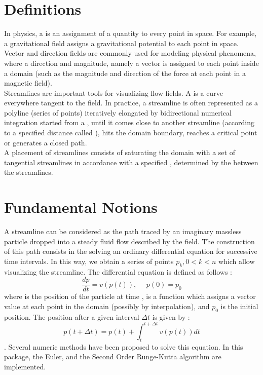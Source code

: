 \section{Definitions\label{Section_2D_Streamlines_Definitions}}

In physics, a  is an assignment of a quantity to every
point in space. For example, a gravitational field assigns a
gravitational potential to each point in space.\\

Vector and direction fields are commonly used for modeling physical
phenomena, where a direction and magnitude, namely a vector is assigned to
each point inside a domain (such as the magnitude and direction of the
force at each point in a magnetic field).\\

Streamlines are important tools for visualizing flow fields. A
 is a curve everywhere tangent to the field. In practice, 
a streamline is often represented as a polyline (series of points)
iteratively elongated by bidirectional numerical integration started
from a , until it comes close to another streamline
(according to a specified distance called ), hits the domain boundary, reaches a critical point or
generates a closed path.\\

A  placement of streamlines consists of saturating the
domain with a set of tangential streamlines in accordance with a
specified , determined by the 
between the streamlines.

\section{Fundamental Notions\label{Section_2D_Streamlines_Fundamental_notions}}

A streamline can be considered as the path traced by an imaginary
massless particle dropped into a steady fluid flow described by the
field. The construction of this path consists in the solving an
ordinary differential equation for successive time intervals. In this
way, we obtain a series of points $p_k, 0<k<n$ which allow visualizing
the streamline. The differential equation is defined as follows :
$$\frac{dp}{dt} = v(p(t)), \ \ \ \ \ \ p(0) = p_0$$ where  is the
position of the particle at time ,  is a function which
assigns a vector value at each point in the domain (possibly by
interpolation), and $p_0$ is the initial position.  The position after
a given interval $\Delta t$ is given by : $$p(t + \Delta t) = p(t) +
\int_t^{t+\Delta t} v(p(t)) dt$$. Several numeric methods have been
proposed to solve this equation. In this package, the Euler, and the
Second Order Runge-Kutta algorithm are implemented.


